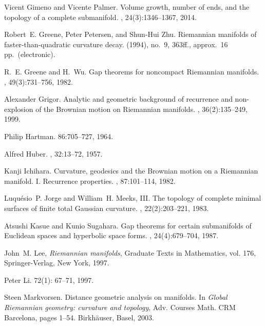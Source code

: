 \documentclass[a4paper]{amsart}
\theoremstyle{definition}
\numberwithin{equation}{section}
\begin{document}
\begin{thebibliography}{10}
Vicent Gimeno and Vicente Palmer.
\newblock Volume growth, number of ends, and the topology of a complete
  submanifold.
, 24(3):1346--1367, 2014.

Robert~E. Greene, Peter Petersen, and Shun-Hui Zhu. 
\newblock Riemannian manifolds of faster-than-quadratic curvature decay.
  (1994), no.~9, 363ff., approx.\ 16 pp.\ (electronic). 

R.~E. Greene and H.~Wu.
\newblock Gap theorems for noncompact {R}iemannian manifolds.
, 49(3):731--756, 1982.

Alexander Grigor\cprimeyan.
\newblock Analytic and geometric background of recurrence and non-explosion of
  the {B}rownian motion on {R}iemannian manifolds.
, 36(2):135--249, 1999.

Philip Hartman. 
 86:705--727, 1964.

Alfred Huber. 
, 32:13--72,  1957.

Kanji Ichihara.
\newblock Curvature, geodesics and the {B}rownian motion on a {R}iemannian
  manifold. {I}. {R}ecurrence properties.
, 87:101--114, 1982.

Luqu{\'e}sio~P. Jorge and William~H. Meeks, III.
\newblock The topology of complete minimal surfaces of finite total {G}aussian
  curvature.
, 22(2):203--221, 1983.

Atsushi Kasue and Kunio Sugahara.
\newblock Gap theorems for certain submanifolds of {E}uclidean spaces and
  hyperbolic space forms.
, 24(4):679--704, 1987.

John~M. Lee, \emph{Riemannian manifolds}, Graduate Texts in Mathematics, vol.
  176, Springer-Verlag, New York, 1997.

Peter Li.
 72(1): 67--71, 1997.

Steen Markvorsen.
\newblock Distance geometric analysis on manifolds.
\newblock In {\em Global {R}iemannian geometry: curvature and topology}, Adv.
  Courses Math. CRM Barcelona, pages 1--54. Birkh\"auser, Basel, 2003.


\end{thebibliography}
\end{document}
